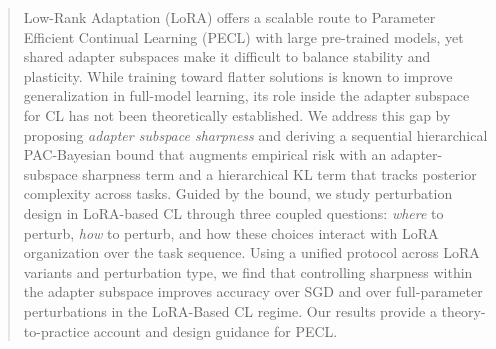 \documentclass{article}
\theoremstyle{plain}
\theoremstyle{definition}
\theoremstyle{remark}
\begin{document}


\printAffiliationsAndNotice{}

\begin{abstract}
Low-Rank Adaptation (LoRA) offers a scalable route to Parameter Efficient Continual Learning (PECL) with large pre-trained models, yet shared adapter subspaces make it difficult to balance stability and plasticity. While training toward flatter solutions is known to improve generalization in full-model learning, its role {inside the adapter subspace} for CL has not been theoretically established. We address this gap by proposing \emph{adapter subspace sharpness} and deriving a sequential hierarchical PAC-Bayesian  bound that augments empirical risk with an adapter-subspace sharpness term and a hierarchical KL term that tracks posterior complexity across tasks. Guided by the bound, we study perturbation design in LoRA-based CL through three coupled questions: \emph{where} to perturb, \emph{how} to perturb, and how these choices interact with LoRA organization over the task sequence. Using a unified protocol across LoRA variants and perturbation type, we find that controlling sharpness within the adapter subspace improves accuracy over SGD and over full-parameter  perturbations in the  LoRA-Based CL regime. Our results provide a theory-to-practice account and design guidance for PECL.

 



\end{abstract}
\end{document}
